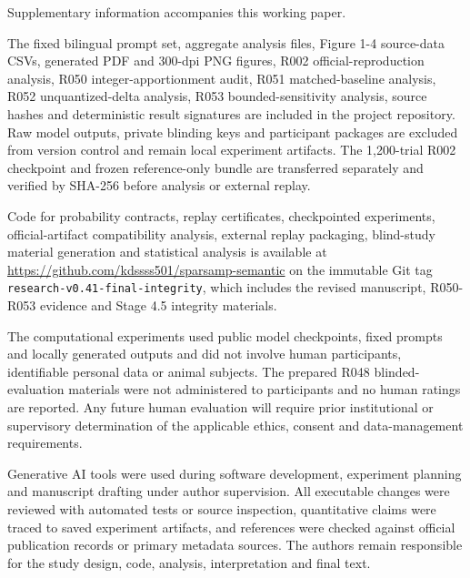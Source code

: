 \documentclass{nature}
\begin{document}
\begin{addendum}

\item[Supplementary information] Supplementary information accompanies this working paper.

\item[Data availability] The fixed bilingual prompt set, aggregate analysis files, Figure 1-4 source-data CSVs, generated PDF and 300-dpi PNG figures, R002 official-reproduction analysis, R050 integer-apportionment audit, R051 matched-baseline analysis, R052 unquantized-delta analysis, R053 bounded-sensitivity analysis, source hashes and deterministic result signatures are included in the project repository. Raw model outputs, private blinding keys and participant packages are excluded from version control and remain local experiment artifacts. The 1,200-trial R002 checkpoint and frozen reference-only bundle are transferred separately and verified by SHA-256 before analysis or external replay.

\item[Code availability] Code for probability contracts, replay certificates, checkpointed experiments, official-artifact compatibility analysis, external replay packaging, blind-study material generation and statistical analysis is available at \url{https://github.com/kdssss501/sparsamp-semantic} on the immutable Git tag \texttt{research-\allowbreak{}v0.\allowbreak{}41-\allowbreak{}final-\allowbreak{}integrity}, which includes the revised manuscript, R050-R053 evidence and Stage 4.5 integrity materials.

\item[Ethics declaration] The computational experiments used public model checkpoints, fixed prompts and locally generated outputs and did not involve human participants, identifiable personal data or animal subjects. The prepared R048 blinded-evaluation materials were not administered to participants and no human ratings are reported. Any future human evaluation will require prior institutional or supervisory determination of the applicable ethics, consent and data-management requirements.

\item[AI-assisted work disclosure] Generative AI tools were used during software development, experiment planning and manuscript drafting under author supervision. All executable changes were reviewed with automated tests or source inspection, quantitative claims were traced to saved experiment artifacts, and references were checked against official publication records or primary metadata sources. The authors remain responsible for the study design, code, analysis, interpretation and final text.

\end{addendum}
\end{document}

